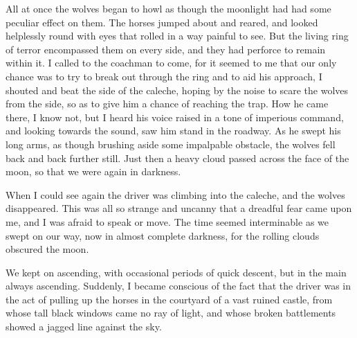 All at once the wolves began to howl as though the moonlight had had some peculiar effect on them. The horses jumped about and reared, and looked helplessly round with eyes that rolled in a way painful to see. But the living ring of terror encompassed them on every side, and they had perforce to remain within it. I called to the coachman to come, for it seemed to me that our only chance was to try to break out through the ring and to aid his approach, I shouted and beat the side of the caleche, hoping by the noise to scare the wolves from the side, so as to give him a chance of reaching the trap. How he came there, I know not, but I heard his voice raised in a tone of imperious command, and looking towards the sound, saw him stand in the roadway. As he swept his long arms, as though brushing aside some impalpable obstacle, the wolves fell back and back further still. Just then a heavy cloud passed across the face of the moon, so that we were again in darkness.

When I could see again the driver was climbing into the caleche, and the wolves disappeared. This was all so strange and uncanny that a dreadful fear came upon me, and I was afraid to speak or move. The time seemed interminable as we swept on our way, now in almost complete darkness, for the rolling clouds obscured the moon.

We kept on ascending, with occasional periods of quick descent, but in the main always ascending. Suddenly, I became conscious of the fact that the driver was in the act of pulling up the horses in the courtyard of a vast ruined castle, from whose tall black windows came no ray of light, and whose broken battlements showed a jagged line against the sky. 
